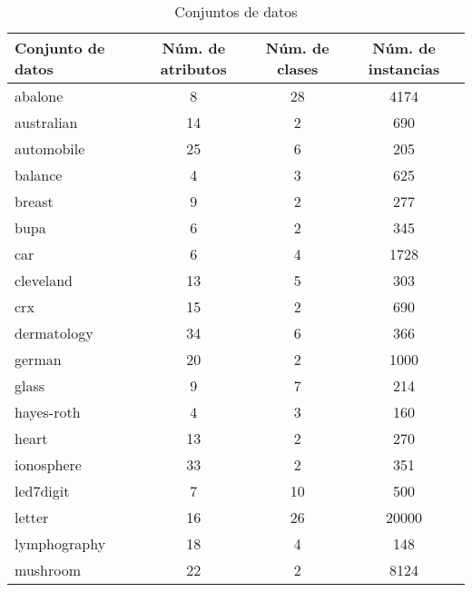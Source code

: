 \begin{table}[H]
\centering
\caption{Conjuntos de datos}
\label{tab:DS}
\begin{tabular}{@{}lccc@{}}
\toprule
Conjunto de datos & Núm. de atributos & Núm. de clases & Núm. de instancias \\ \midrule
abalone           & 8                   & 28               & 4174                 \\
australian        & 14                  & 2                & 690                  \\
automobile        & 25                  & 6                & 205                  \\
balance           & 4                   & 3                & 625                  \\
breast            & 9                   & 2                & 277                  \\
bupa              & 6                   & 2                & 345                  \\
car               & 6                   & 4                & 1728                 \\
cleveland         & 13                  & 5                & 303                  \\
crx               & 15                  & 2                & 690                  \\
dermatology       & 34                  & 6                & 366                  \\
german            & 20                  & 2                & 1000                 \\
glass             & 9                   & 7                & 214                  \\
hayes-roth        & 4                   & 3                & 160                  \\
heart             & 13                  & 2                & 270                  \\
ionosphere        & 33                  & 2                & 351                  \\
led7digit         & 7                   & 10               & 500                  \\
letter            & 16                  & 26               & 20000                \\
lymphography      & 18                  & 4                & 148                  \\
mushroom          & 22                  & 2                & 8124                 \\

\end{tabular}
\end{table}
